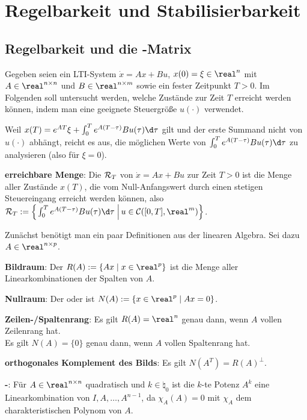 \section{%
    Regelbarkeit und Stabilisierbarkeit%
}

\subsection{%
    Regelbarkeit und die -Matrix%
}

Gegeben seien ein LTI-System $\dot{x} = Ax + Bu$, $x(0) = \xi \in \real^n$
mit $A \in \real^{n \times n}$ und $B \in \real^{n \times m}$
sowie ein fester Zeitpunkt $T > 0$.
Im Folgenden soll untersucht werden, welche Zustände zur Zeit $T$ erreicht werden können,
indem man eine geeignete Steuergröße $u(\cdot)$ verwendet.

Weil $x(T) = e^{AT} \xi + \int_0^T e^{A(T - \tau)} Bu(\tau) \d\tau$ gilt
und der erste Summand nicht von $u(\cdot)$ abhängt, reicht es aus, die möglichen Werte
von $\int_0^T e^{A(T - \tau)} Bu(\tau)\d\tau$ zu analysieren
(also für $\xi = 0$).

\textbf{erreichbare Menge}:
Die  $\mathcal{R}_T$ von $\dot{x} = Ax + Bu$ zur Zeit $T > 0$
ist die Menge aller Zustände $x(T)$, die vom Null-Anfangswert durch einen stetigen Steuereingang
erreicht werden können,
also $\R_T := \left\{\left.\int_0^T e^{A(T - \tau)} Bu(\tau)\d\tau \;\right|
u \in \C([0, T], \real^m)\right\}$.

\linie

Zunächst benötigt man ein paar Definitionen aus der linearen Algebra.
Sei dazu $A \in \real^{n \times p}$.

\textbf{Bildraum}:
Der  $R(A) := \{Ax \;|\; x \in \real^p\}$ ist die Menge
aller Linearkombinationen der Spalten von $A$.

\textbf{Nullraum}:
Der  oder  ist
$N(A) := \{x \in \real^p \;|\; Ax = 0\}$.

\textbf{Zeilen-/Spaltenrang}:
Es gilt $R(A) = \real^n$ genau dann, wenn $A$ vollen Zeilenrang hat.\\
Es gilt $N(A) = \{0\}$ genau dann, wenn $A$ vollen Spaltenrang hat.

\textbf{orthogonales Komplement des Bilds}:
Es gilt $N(A^T) = R(A)^\bot$.

\textbf{-}:
Für $A \in \real^{n \times n}$ quadratisch und $k \in \natural_0$
ist die $k$-te Potenz $A^k$ eine Linearkombination von $I, A, \dotsc, A^{n-1}$,
da $\chi_A(A) = 0$ mit $\chi_A$ dem charakteristischen Polynom von $A$.

